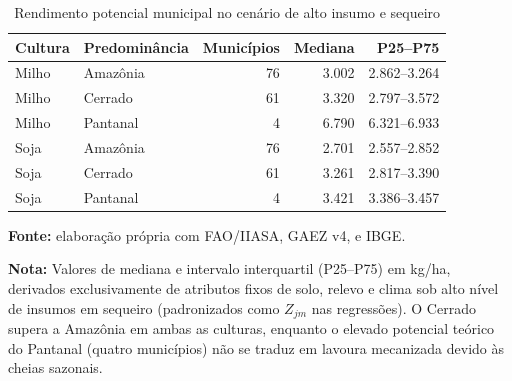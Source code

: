 \begin{table}[htbp]
\centering
\footnotesize
\captionstyle{\centering}
\normalcaption
\caption{Rendimento potencial municipal no cenário de alto insumo e sequeiro}\label{tab:h1-capacidade}
\begin{tabular}{llrrr}
\toprule
Cultura & Predominância & Municípios & Mediana & P25--P75 \\
\midrule
Milho & Amazônia & 76 & 3.002 & 2.862--3.264 \\
Milho & Cerrado & 61 & 3.320 & 2.797--3.572 \\
Milho & Pantanal & 4 & 6.790 & 6.321--6.933 \\
Soja & Amazônia & 76 & 2.701 & 2.557--2.852 \\
Soja & Cerrado & 61 & 3.261 & 2.817--3.390 \\
Soja & Pantanal & 4 & 3.421 & 3.386--3.457 \\
\bottomrule
\end{tabular}
\par\smallskip\begin{minipage}{\textwidth}\footnotesize
\SingleSpacing
\noindent\textbf{Fonte:} elaboração própria com FAO/IIASA, GAEZ v4, e IBGE.\par\medskip
\noindent\textbf{Nota:} Valores de mediana e intervalo interquartil (P25--P75) em kg/ha, derivados exclusivamente de atributos fixos de solo, relevo e clima sob alto nível de insumos em sequeiro (padronizados como $Z_{jm}$ nas regressões). O Cerrado supera a Amazônia em ambas as culturas, enquanto o elevado potencial teórico do Pantanal (quatro municípios) não se traduz em lavoura mecanizada devido às cheias sazonais.
\end{minipage}
\end{table}
